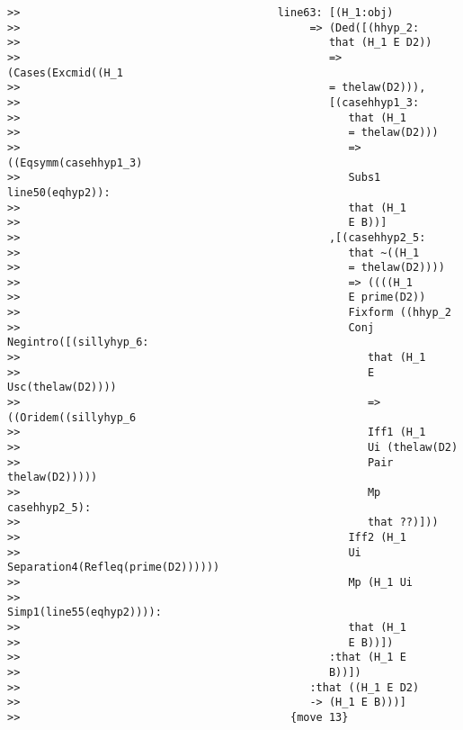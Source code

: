 \documentclass[12pt]{article}
\begin{document}
\begin{verbatim}
>>                                        line63: [(H_1:obj)
>>                                             => (Ded([(hhyp_2:
>>                                                that (H_1 E D2))
>>                                                => (Cases(Excmid((H_1
>>                                                = thelaw(D2))),
>>                                                [(casehhyp1_3:
>>                                                   that (H_1
>>                                                   = thelaw(D2)))
>>                                                   => ((Eqsymm(casehhyp1_3)
>>                                                   Subs1 line50(eqhyp2)):
>>                                                   that (H_1
>>                                                   E B))]
>>                                                ,[(casehhyp2_5:
>>                                                   that ~((H_1
>>                                                   = thelaw(D2))))
>>                                                   => ((((H_1
>>                                                   E prime(D2))
>>                                                   Fixform ((hhyp_2
>>                                                   Conj Negintro([(sillyhyp_6:
>>                                                      that (H_1
>>                                                      E Usc(thelaw(D2))))
>>                                                      => ((Oridem((sillyhyp_6
>>                                                      Iff1 (H_1
>>                                                      Ui (thelaw(D2)
>>                                                      Pair thelaw(D2)))))
>>                                                      Mp casehhyp2_5):
>>                                                      that ??)]))
>>                                                   Iff2 (H_1
>>                                                   Ui Separation4(Refleq(prime(D2))))))
>>                                                   Mp (H_1 Ui
>>                                                   Simp1(line55(eqhyp2)))):
>>                                                   that (H_1
>>                                                   E B))])
>>                                                :that (H_1 E
>>                                                B))])
>>                                             :that ((H_1 E D2)
>>                                             -> (H_1 E B)))]
>>                                          {move 13}




\end{verbatim}
\end{document}
